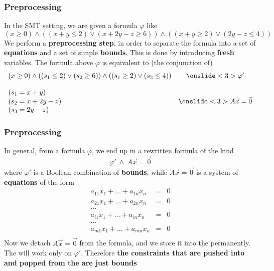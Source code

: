 \begin{frame}
  \frametitle{Preprocessing}

  In the SMT setting, we are given a formula $\varphi$ like
  $$
  (x \geq 0) \wedge ((x + y \leq 2) \vee (x + 2y - z \geq 6)) \wedge ((x + y \geq 2) \vee (2y - z \leq 4))
  $$
  We perform a {\bf preprocessing step}, in order to separate the formula into a set of {\bf equations}
  and a set of simple {\bf bounds}. This is done by introducing {\bf fresh} variables. 
  \pause
  \vfill
  The formula above $\varphi$ is equivalent to (the conjunction of)
  $$
  \begin{array}{lc}
    (x \geq 0) \wedge ((s_1 \leq 2) \vee (s_2 \geq 6)) \wedge ((s_1 \geq 2) \vee (s_3 \leq 4)) & \onslide<3>{\varphi'} \\
    \\
    (s_1 = x + y) \\ 
    (s_2 = x + 2y - z) & \onslide<3>{A\vec{x}=\vec{0}} \\
    (s_3 = 2y - z)
  \end{array}
  $$

\end{frame}

\begin{frame}
  \frametitle{Preprocessing}
  In general, from a formula $\varphi$, we end up in a rewritten formula of the kind
  $$
  \varphi' \ \wedge\ A\vec{x} = \vec{0} 
  $$
  where $\varphi'$ is a Boolean combination of {\bf bounds}, while $A\vec{x}=\vec{0}$ is a system of {\bf equations}
  of the form
  $$
  \begin{array}{rcl}
    a_{11} x_1 + \ldots + a_{1n} x_n & = & 0 \\ 
    a_{21} x_1 + \ldots + a_{2n} x_n & = & 0 \\ 
    \ldots \\                             
    a_{i1} x_1 + \ldots + a_{in} x_n & = & 0 \\ 
    \ldots \\                             
    a_{m1} x_1 + \ldots + a_{mn} x_n & = & 0 \\ 
  \end{array}
  $$
  \vfill
  \pause
  Now we detach $A\vec{x} = \vec{0}$ from the formula, and we store it into the \tsolver
  permanently. The \satsolver will work only on $\varphi'$. Therefore {\bf the constraints
  that are pushed into and popped from the \tsolver are just bounds} 

\end{frame}
